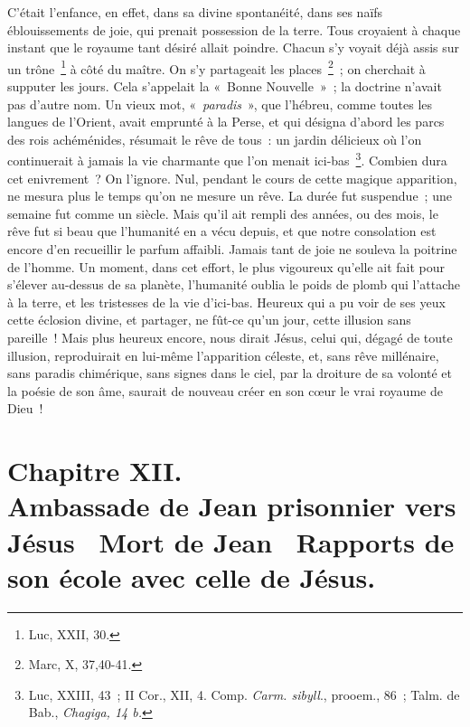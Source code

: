 \documentclass[french,twoside]{book} %
\newcommand\chapteropen{} %
\newcommand\chapterclose{} %
\begin{document}
C’était l’enfance, en effet, dans sa divine spontanéité, dans ses naïfs éblouissements de joie, qui prenait possession de la terre. Tous croyaient à chaque instant que le royaume tant désiré allait poindre. Chacun s’y voyait déjà assis sur un trône \footnote{Luc, XXII, 30.} à côté du maître. On s’y partageait les places \footnote{Marc, X, 37,40-41.} ; on cherchait à supputer les jours. Cela s’appelait la « Bonne Nouvelle » ; la doctrine n’avait pas d’autre nom. Un vieux mot, « {\itshape paradis} », que l’hébreu, comme toutes les langues de l’Orient, avait emprunté à la Perse, et qui désigna d’abord les parcs des rois achéménides, résumait le rêve de tous : un jardin délicieux où l’on continuerait à jamais la vie charmante que l’on menait ici-bas \footnote{ Luc, XXIII, 43 ; II Cor., XII, 4. Comp. {\itshape Carm. sibyll}., prooem., 86 ; Talm. de Bab., {\itshape Chagiga, 14 b.}}. Combien dura cet enivrement ? On l’ignore. Nul, pendant le cours de cette magique apparition, ne mesura plus le temps qu’on ne mesure un rêve. La durée fut suspendue ; une semaine fut comme un siècle. Mais qu’il ait rempli des années, ou des mois, le rêve fut si beau que l’humanité en a vécu depuis, et que notre consolation est encore d’en recueillir le parfum affaibli. Jamais tant de joie ne souleva la poitrine de l’homme. Un moment, dans cet effort, le plus vigoureux qu’elle ait fait pour s’élever au-dessus de sa planète, l’humanité oublia le poids de plomb qui l’attache à la terre, et les tristesses de la vie d’ici-bas. Heureux qui a pu voir de ses yeux cette éclosion divine, et partager, ne fût-ce qu’un jour, cette illusion sans pareille ! Mais plus heureux encore, nous dirait Jésus, celui qui, dégagé de toute illusion, reproduirait en lui-même l’apparition céleste, et, sans rêve millénaire, sans paradis chimérique, sans signes dans le ciel, par la droiture de sa volonté et la poésie de son âme, saurait de nouveau créer en son cœur le vrai royaume de Dieu !
\chapterclose


\chapteropen
\chapter[{Chapitre XII. Ambassade de Jean prisonnier vers Jésus  Mort de Jean  Rapports de son école avec celle de Jésus.}]{Chapitre XII.\\
Ambassade de Jean prisonnier vers Jésus  Mort de Jean  Rapports de son école avec celle de Jésus.}\renewcommand{\leftmark}{Chapitre XII.\\
Ambassade de Jean prisonnier vers Jésus  Mort de Jean  Rapports de son école avec celle de Jésus.}
\end{document}

